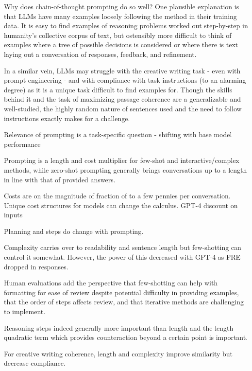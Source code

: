 \documentclass[11pt]{article}
\begin{document}
Why does chain-of-thought prompting do so well? One plausible explanation is that LLMs have many examples loosely following the method in their training data. It is easy to find examples of reasoning problems worked out step-by-step in humanity's collective corpus of text, but ostensibly more difficult to think of examples where a tree of possible decisions is considered or where there is text laying out a conversation of responses, feedback, and refinement.

In a similar vein, LLMs may struggle with the creative writing task - even with prompt engineering - and with compliance with task instructions (to an alarming degree) as it is a unique task difficult to find examples for. Though the skills behind it and the task of maximizing passage coherence are a generalizable and well-studied, the highly random nature of sentences used and the need to follow instructions exactly makes for a challenge.

Relevance of prompting is a task-specific question - shifting with base model performance

Prompting is a length and cost multiplier for few-shot and interactive/complex methods, while zero-shot prompting generally brings conversations up to a length in line with that of provided answers.

Costs are on the magnitude of fraction of to a few pennies per conversation. Unique cost structures for models can change the calculus. GPT-4 discount on inputs

Planning and steps do change with prompting.

Complexity carries over to readability and sentence length but few-shotting can control it somewhat. However, the power of this decreased with GPT-4 as FRE dropped in responses.

Human evaluations add the perspective that few-shotting can help with formatting for ease of review despite potential difficulty in providing examples, that the order of steps affects review, and that iterative methods are challenging to implement.

Reasoning steps indeed generally more important than length and the length quadratic term which provides counteraction beyond a certain point is important.

For creative writing coherence, length and complexity improve similarity but decrease compliance.


\end{document}
